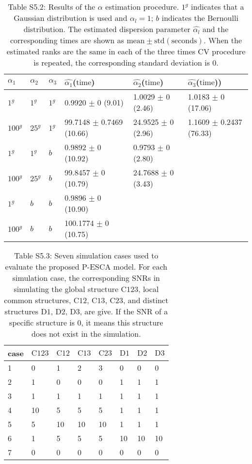\begin{table}[htbp]
\centering
\caption*{Table S5.2: Results of the $\alpha$ estimation procedure. $1^{g}$ indicates that a Gaussian distribution is used and $\alpha_l = 1$; $b$ indicates the Bernoulli distribution.  The estimated dispersion parameter $\hat{\alpha_l}$ and the corresponding times are shown as $\text{mean} \pm \text{std} (\text{seconds})$. When the estimated ranks are the same in each of the three times CV procedure is repeated, the corresponding standard deviation is 0.}
\label{chapter5_tab:S2}
\begin{tabular}{llllll}
 \hline
   $\alpha_1$ & $\alpha_2$ & $\alpha_3$ & $\hat{\alpha_1}$($\text{time}$) & $\hat{\alpha_2}$($\text{time}$) & $\hat{\alpha_3}$($\text{time}$)) \\
 \hline
  $1^{g}$   & $1^{g}$  & $1^{g}$ & 0.9920  $\pm$ 0 (9.01)  & 1.0029  $\pm$ 0 (2.46) & 1.0183 $\pm$ 0 (17.06) \\
  $100^{g}$ & $25^{g}$ & $1^{g}$ & 99.7148 $\pm$ 0.7469 (10.66) & 24.9525 $\pm$ 0 (2.96) & 1.1609 $\pm$ 0.2437 (76.33) \\
  \hline
  $1^{g}$   & $1^{g}$  & $b$     & 0.9892  $\pm$ 0 (10.92)  & 0.9793  $\pm$ 0 (2.80) &  \\
  $100^{g}$ & $25^{g}$ & $b$     & 99.8457 $\pm$ 0 (10.79)  & 24.7688 $\pm$ 0 (3.43) &  \\
  \hline
  $1^{g}$   & $b$ & $b$     & 0.9896   $\pm$ 0 (10.90) &  &  \\
  $100^{g}$ & $b$ & $b$     & 100.1774 $\pm$ 0 (10.75) &  &  \\

  \hline
\end{tabular}
\end{table}

\begin{table}[htbp]
\centering
\caption*{Table S5.3: Seven simulation cases used to evaluate the proposed P-ESCA model. For each simulation case, the corresponding SNRs in simulating the global structure $\text{C123}$, local common structures, $\text{C12}$, $\text{C13}$, $\text{C23}$, and distinct structures $\text{D1}$, $\text{D2}$, $\text{D3}$, are give. If the SNR of a specific structure is 0, it means this structure does not exist in the simulation.}
\label{chapter5_tab:S3}
\begin{tabular}{llllllll}
  \toprule
case & $\text{C123}$ & $\text{C12}$ & $\text{C13}$ & $\text{C23}$ & $\text{D1}$ & $\text{D2}$ & $\text{D3}$ \\
  \midrule
 1   & 0  & 1  & 2  & 3   & 0  & 0  & 0   \\
 2   & 1  & 0  & 0  & 0   & 1  & 1  & 1   \\
 3   & 1  & 1  & 1  & 1   & 1  & 1  & 1   \\
 4   & 10 & 5  & 5  & 5   & 1  & 1  & 1   \\
 5   & 5  & 10 & 10 & 10  & 1  & 1  & 1   \\
 6   & 1  & 5  & 5  & 5   & 10 & 10 & 10   \\
 7   & 0  &  0 & 0  & 0   & 0  & 0  & 0   \\
  \bottomrule
\end{tabular}
\end{table}

